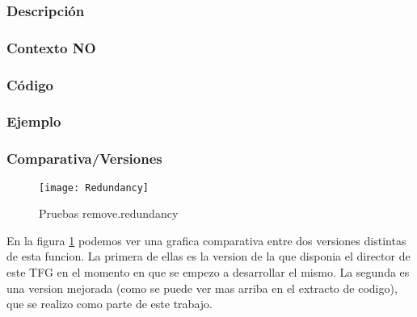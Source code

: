 \subsubsection{Descripci\'on} 
\subsubsection{Contexto NO} 
\newpage
\subsubsection{C\'odigo} 

\newpage
\subsubsection{Ejemplo} 
\subsubsection{Comparativa/Versiones} 
\begin{figure}[h]
    \centering
    \texttt{[image: Redundancy]}
    \caption{Pruebas remove.redundancy}
    \label{fig:redundancy}
\end{figure} 

En la figura \ref{fig:redundancy} podemos ver una grafica comparativa entre dos versiones distintas de esta funcion. La primera de ellas es la version de la que disponia el director de este TFG en el momento en que se empezo a desarrollar el mismo. La segunda es una version mejorada (como se puede ver mas arriba en el extracto de codigo), que se realizo como parte de este trabajo.